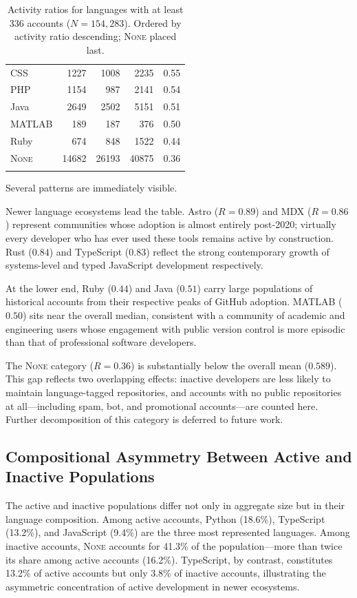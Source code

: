 \documentclass[12pt,a4paper]{article}
\begin{document}
\begin{longtable}{lrrrr}
CSS                &  1227 &   1008 &    2235 & 0.55 \\
PHP                &  1154 &    987 &    2141 & 0.54 \\
Java               &  2649 &   2502 &    5151 & 0.51 \\
MATLAB             &    189 &    187 &     376 & 0.50 \\
Ruby               &    674 &    848 &    1522 & 0.44 \\
\textsc{None}      & 14682 &  26193 &   40875 & 0.36 \\
\caption{Activity ratios for languages with at least 336 accounts ($N=154{,}283$).
Ordered by activity ratio descending; \textsc{None} placed last.}
\label{tab:activity}
\end{longtable}

Several patterns are immediately visible.

Newer language ecosystems lead the table. Astro ($R = 0.89$) and MDX ($R =
0.86$) represent communities whose adoption is almost entirely post-2020;
virtually every developer who has ever used these tools remains active by
construction. Rust ($0.84$) and TypeScript ($0.83$) reflect the strong
contemporary growth of systems-level and typed JavaScript development
respectively.

At the lower end, Ruby ($0.44$) and Java ($0.51$) carry large populations of
historical accounts from their respective peaks of GitHub adoption. MATLAB
($0.50$) sits near the overall median, consistent with a community of academic
and engineering users whose engagement with public version control is more
episodic than that of professional software developers.

The \textsc{None} category ($R = 0.36$) is substantially below the overall mean
($0.589$). This gap reflects two overlapping effects: inactive developers are
less likely to maintain language-tagged repositories, and accounts with no public
repositories at all---including spam, bot, and promotional accounts---are
counted here. Further decomposition of this category is deferred to future work.

\subsection{Compositional Asymmetry Between Active and Inactive Populations}

The active and inactive populations differ not only in aggregate size but in
their language composition. Among active accounts, Python (18.6\%), TypeScript
(13.2\%), and JavaScript (9.4\%) are the three most represented languages. Among
inactive accounts, \textsc{None} accounts for 41.3\% of the population---more
than twice its share among active accounts (16.2\%). TypeScript, by contrast,
constitutes 13.2\% of active accounts but only 3.8\% of inactive accounts,
illustrating the asymmetric concentration of active development in newer
ecosystems.
\end{document}
